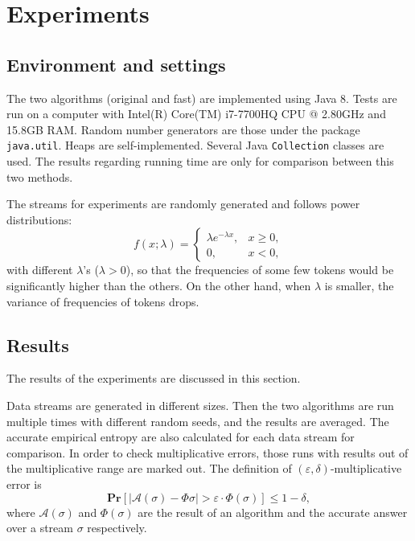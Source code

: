 \documentclass{scrartcl}
\renewcommand{\Pr}[1]{\mathbf{Pr}\left[#1\right]}
\begin{document}
\section{Experiments} %
\label{sec:experiments}
\subsection{Environment and settings} %
\label{sub:environment}
The two algorithms (original and fast) are implemented using Java 8. Tests are run on a computer with Intel(R) Core(TM) i7-7700HQ CPU @ 2.80GHz and 15.8GB RAM. Random number generators are those under the package \texttt{java.util}. Heaps are self-implemented. Several Java \texttt{Collection} classes are used. The results regarding running time are only for comparison between this two methods.

The streams for experiments are randomly generated and follows power distributions: 
\begin{equation*}
	f(x;\lambda)=\begin{cases}
		\lambda e^{-\lambda x}, & x\geq0, \\
		0, & x<0,
	\end{cases}
\end{equation*}
with different $\lambda$'s ($\lambda>0$), so that the frequencies of some few tokens would be significantly higher than the others. On the other hand, when $\lambda$ is smaller, the variance of frequencies of tokens drops.

\subsection{Results} %
\label{sub:results}
The results of the experiments are discussed in this section.

Data streams are generated in different sizes. Then the two algorithms are run multiple times with different random seeds, and the results are averaged. The accurate empirical entropy are also calculated for each data stream for comparison. In order to check multiplicative errors, those runs with results out of the multiplicative range are marked out. The definition of $(\varepsilon,\delta)$-multiplicative error is
\begin{equation}
	\Pr{|\mathcal{A}(\sigma)-\Phi{\sigma}|>\varepsilon\cdot\Phi(\sigma)}\leq1-\delta,
	\label{eq}
\end{equation}
where $\mathcal{A}(\sigma)$ and $\Phi(\sigma)$ are the result of an algorithm and the accurate answer over a stream $\sigma$ respectively.
\end{document}
